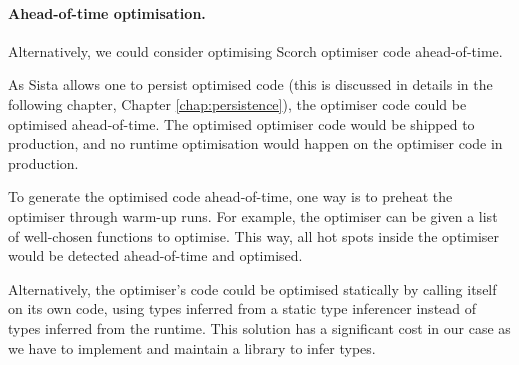 \documentclass[a4paper,12pt,twoside]{../includes/ThesisStyle}
\begin{document}
\paragraph{Ahead-of-time optimisation.} 
Alternatively, we could consider optimising Scorch optimiser code ahead-of-time.

As Sista allows one to persist optimised code (this is discussed in details in the following chapter, Chapter \ref{chap:persistence}), the optimiser code could be optimised ahead-of-time. The optimised optimiser code would be shipped to production, and no runtime optimisation would happen on the optimiser code in production.

To generate the optimised code ahead-of-time, one way is to preheat the optimiser through warm-up runs. For example, the optimiser can be given a list of well-chosen functions to optimise. This way, all hot spots inside the optimiser would be detected ahead-of-time and optimised. 

Alternatively, the optimiser's code could be optimised statically by calling itself on its own code, using types inferred from a static type inferencer instead of types inferred from the runtime. This solution has a significant cost in our case as we have to implement and maintain a library to infer types.




\end{document}
